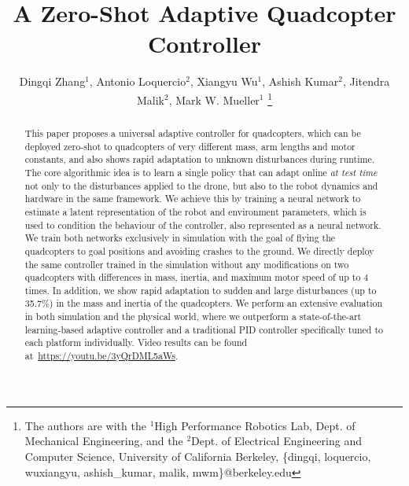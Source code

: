\documentclass[letterpaper, 10 pt, conference]{ieeeconf}  %
\title{\LARGE \bf
A Zero-Shot Adaptive Quadcopter Controller
}
\author{Dingqi Zhang$^1$, Antonio Loquercio$^2$, Xiangyu Wu$^1$, Ashish Kumar$^2$, Jitendra Malik$^2$, Mark W. Mueller$^1$%
\thanks{The authors are with the $^1$High Performance Robotics Lab, Dept. of Mechanical Engineering, and the $^2$Dept. of Electrical Engineering and Computer Science, University of California Berkeley, \{dingqi, loquercio, wuxiangyu, ashish\_kumar, malik, mwm\}@berkeley.edu} 
}
\begin{document}
\maketitle
\maketitle
\thispagestyle{empty}
\pagestyle{empty}



\begin{abstract}

This paper proposes a universal adaptive controller for quadcopters, which can be deployed zero-shot to quadcopters of very different mass, arm lengths and motor constants, and also shows rapid adaptation to unknown disturbances during runtime. The core algorithmic idea is to learn a single policy that can adapt online \emph{at test time} not only to the disturbances applied to the drone, but also to the robot dynamics and hardware in the same framework.
We achieve this by training a neural network to estimate a latent representation of the robot and environment parameters, which is used to condition the behaviour of the controller, also represented as a neural network. We train both networks exclusively in simulation with the goal of flying the quadcopters to goal positions and avoiding crashes to the ground. We directly deploy the same controller trained in the simulation without any modifications on two quadcopters with differences in mass, inertia, and maximum motor speed of up to 4 times. In addition, we show rapid adaptation to sudden and large disturbances (up to 35.7\%) in the mass and inertia of the quadcopters. We perform an extensive evaluation in both simulation and the physical world, where we outperform a state-of-the-art learning-based adaptive controller and a traditional PID controller specifically tuned to each platform individually. Video results can be found at~\url{https://youtu.be/3yQrDML5aWs}. %

\end{abstract}





\end{document}
